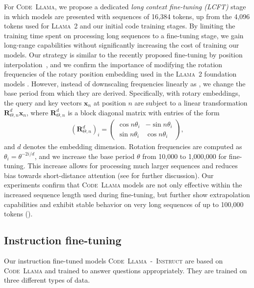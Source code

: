 \documentclass[10pt]{article}
\newcommand{\model}{\textsc{Code~Llama}\xspace}
\newcommand{\instmodel}{\textsc{Code~Llama~-~Instruct}\xspace}
\newcommand{\llamavtwo}{\textsc{Llama~2}\xspace}
\begin{document}
For \model, we propose a dedicated \emph{long context fine-tuning (LCFT)} stage in which models are presented with sequences of 16,384 tokens, up from the 4,096 tokens used for \llamavtwo and our initial code training stages.
By limiting the training time spent on processing long sequences to a fine-tuning stage, we gain long-range capabilities without significantly increasing the cost of training our models.
Our strategy is similar to the recently proposed fine-tuning by position interpolation~\citep{chen2023extending},  and we confirm the importance of modifying the rotation frequencies of the rotary position embedding used in the \llamavtwo foundation models \citep{su2021roformer}.
However, instead of downscaling frequencies linearly as \citet{chen2023extending}, we change the base period from which they are derived.
Specifically, with rotary embeddings, the query and key vectors $\mathbf{x}_n$ at position $n$ are subject to a linear transformation $\mathbf{R}^d_{\Theta,n} \mathbf{x}_n$, where $\mathbf{R}^d_{\Theta,n}$ is a block diagonal matrix with entries of the form
\begin{align*}
   \left( \mathbf{R}^d_{\Theta,n} \right) _i  =
   \begin{pmatrix}
   \cos n \theta_i & -\sin n \theta_i \\
   \sin n \theta_i & \cos n \theta_i
   \end{pmatrix},
\end{align*}
and $d$ denotes the embedding dimension.
Rotation frequencies are computed as $\theta_i = \theta^{-2i/d}$, and we increase the base period $\theta$ from 10,000 to 1,000,000 for fine-tuning.
This increase allows for processing much larger sequences and reduces bias towards short-distance attention (see  for further discussion).
Our experiments confirm that \model models are not only effective within the increased sequence length used during fine-tuning, but further show extrapolation capabilities and exhibit stable behavior on very long sequences of up to 100,000 tokens (). 
\subsection{Instruction fine-tuning}
\label{sec:instruct}

Our instruction fine-tuned models \instmodel are based on \model and trained to answer questions appropriately. They are trained on three different types of data.
\end{document}
